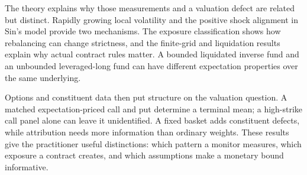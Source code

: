 The theory explains why those measurements and a valuation defect are
related but distinct. Rapidly growing local volatility and the positive
shock alignment in Sin's model provide two mechanisms. The exposure
classification shows how rebalancing can change strictness, and the
finite-grid and liquidation results explain why actual contract rules
matter. A bounded liquidated inverse fund and an unbounded leveraged-long
fund can have different expectation properties over the same underlying.

Options and constituent data then put structure on the valuation question.
A matched expectation-priced call and put determine a terminal mean;
a high-strike call panel alone can leave it unidentified. A fixed basket
adds constituent defects, while attribution needs more information than
ordinary weights. These results give the practitioner useful distinctions:
which pattern a monitor measures, which exposure a contract creates, and
which assumptions make a monetary bound informative.
